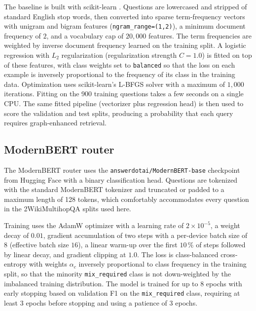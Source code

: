 \documentclass[english, bibtex]{kththesis}               %
\numberwithin{listing}{chapter}
\begin{document}
The baseline is built with scikit-learn \cite{pedregosa2011scikit}. Questions are lowercased and stripped of standard English stop words, then converted into sparse term-frequency vectors with unigram and bigram features (\texttt{ngram\_range=(1,2)}), a minimum document frequency of $2$, and a vocabulary cap of $20{,}000$ features. The term frequencies are weighted by inverse document frequency \cite{salton1988termweighting} learned on the training split. A logistic regression with $L_2$ regularization (regularization strength $C=1.0$) is fitted on top of these features, with class weights set to \texttt{balanced} so that the loss on each example is inversely proportional to the frequency of its class in the training data. Optimization uses scikit-learn's L-BFGS solver \cite{liu1989limited} with a maximum of $1{,}000$ iterations. Fitting on the 900 training questions takes a few seconds on a single CPU. The same fitted pipeline (vectorizer plus regression head) is then used to score the validation and test splits, producing a probability that each query requires graph-enhanced retrieval.

\subsection{ModernBERT router}
\label{sec:implModernBert}

The ModernBERT router uses the \texttt{answerdotai/ModernBERT-base} checkpoint from Hugging Face \cite{warner2024modernbert} with a binary classification head. Questions are tokenized with the standard ModernBERT tokenizer and truncated or padded to a maximum length of 128 tokens, which comfortably accommodates every question in the 2WikiMultihopQA splits used here.

Training uses the AdamW optimizer \cite{loshchilov2019decoupled} with a learning rate of $2 \times 10^{-5}$, a weight decay of $0.01$, gradient accumulation of two steps with a per-device batch size of $8$ (effective batch size $16$), a linear warm-up over the first $10\,\%$ of steps followed by linear decay, and gradient clipping at $1.0$. The loss is class-balanced cross-entropy with weights $\alpha_c$ inversely proportional to class frequency in the training split, so that the minority \texttt{mix\_required} class is not down-weighted by the imbalanced training distribution. The model is trained for up to $8$ epochs with early stopping based on validation F1 on the \texttt{mix\_required} class, requiring at least $3$ epochs before stopping and using a patience of $3$ epochs.
\end{document}
